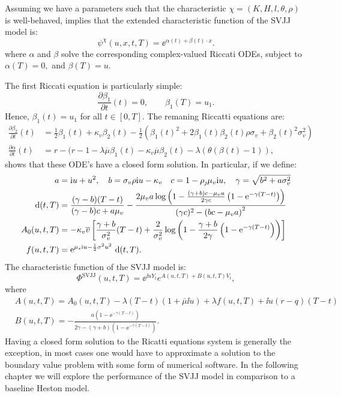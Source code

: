 Assuming we have a parameters such that the characteristic $\chi=(K, H, l, \theta, \rho)$ is
well-behaved,  implies that the extended characteristic function of the SVJJ
model is:
\[ 
    \psi^{\chi}(u, x, t, T) = \ee^{\alpha(t) + \beta(t) \cdot x}
.\]
where $\alpha$ and $\beta$ solve the corresponding complex-valued Riccati ODEs, subject to
$\alpha(T)=0,$ and $ \beta(T)=u$.

The first Riccati equation is particularly simple:
\[
\frac{\partial\beta_1}{\partial t}(t)=0,
\qquad
\beta_1(T)=u_1.
\]
Hence, $\beta_1(t)=u_1$ for all $t \in[0,T]$. The remaning Riccatti equations are:
  \begin{align*} 
    \frac{\partial \beta_2}{\partial t} (t) &= \frac{1}{2} \beta_1(t) + \kappa_v \beta_2(t) -
    \frac{1}{2} (\beta_1(t)^2  + 2\beta_1(t) \beta_2(t) \rho \sigma_v + \beta_2(t)^2  \sigma_v^2 )  \\  
    \frac{\partial \alpha}{\partial t} (t) &= r - (r-1-\lambda \overline{\mu}\beta_1(t)  - \kappa_v
    \overline{\mu}\beta_2(t) - \lambda(\theta(\beta(t) -1))
  ,\end{align*}
\parencite{Duffie2000} shows that these ODE's have a closed form solution. In particular, if we
define: 
\begin{align*}
a & =\text{i} u+u^2, \quad b=\sigma_v \rho \text{i} u-\kappa_v \quad 
c  =1-\rho_{\jmath} \mu_v \text{i} u, \quad \gamma=\sqrt{b^2+a \sigma_v^2} \\
\text{ d}(t, T) & =\frac{(\gamma-b)(T-t)}{(\gamma-b) c+a \mu_v}-\frac{2 \mu_v a \log
\left(1-\frac{(\gamma+b) c-\mu_v a}{2 \gamma c}\left(1-\text{e}^{-\gamma(T-t)}\right)\right)}{(\gamma c)^2-\left(b c-\mu_v a\right)^2} \\
A_0(u, t, T) & =-\kappa_v \overline{v}\left[\frac{\gamma+b}{\sigma_v^2}(T-t)+\frac{2}{\sigma_v^2} \log
\left(1-\frac{\gamma+b}{2 \gamma}\left(1-\text{e}^{-\gamma(T-t)}\right)\right)\right] \\
f(u, t, T) & =\text{e}^{\mu_{s} \text{i} u-\frac{1}{2} \sigma^2 u^2} \text{ d}(t, T) .
\end{align*}
The characteristic function of the SVJJ model is: 
\[
\Phi^{\text{SVJJ}}(u, t, T)=\ee^{\ii u Y_t} e^{A(u, t, T)+B(u, t, T) V_t},
\]
where
\begin{align*}
& A(u, t, T)=A_0(u, t, T)-\lambda(T-t)(1+\bar{\mu} \ii u)+\lambda f(u, t, T) + \ii u(r-q)(T-t)\\
& B(u, t, T)=-\frac{a\left(1-\ee^{-\gamma(T-t)}\right)}{2 \gamma-(\gamma+b)\left(1-\ee^{-\gamma(T-t)}\right)} .
\end{align*}
Having a closed form solution to the Ricatti equations system is generally the exception, in most
cases one would have to approximate a solution to the boundary value problem with some form of
numerical software. In the following chapter we will explore the performance of the SVJJ model in
comparison to a baseline Heston model.




